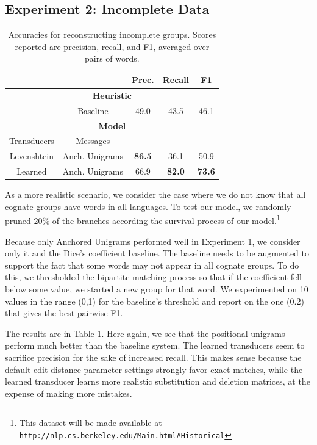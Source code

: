 \documentclass[11pt,a4paper]{article}
\begin{document}
\subsection{Experiment 2: Incomplete Data}

\begin{table}
\resizebox{3in}{!} {
  \begin{tabular}{|c|c|c|c|c|}
    \cline{3-5} 
    \multicolumn{2}{c|}{\textbf{}} & Prec. & Recall & F1 \\
    \hline 
    \multicolumn{5}{|c|}{\textbf{Heuristic}} \\
    \hline
    \multicolumn{1}{|c}{} & \multicolumn{1}{c|}{Baseline} & 49.0 &
    43.5 & 46.1 \\
    \hline
    \hline
    \multicolumn{5}{|c|}{\textbf{Model}} \\
    \hline
    Transducers & Messages & \multicolumn{2}{c}{} \\
    \hline
    Levenshtein&Anch. Unigrams & \textbf{86.5} & 36.1 & 50.9 \\
    Learned&Anch. Unigrams  & 66.9 & \textbf{82.0} & \textbf{73.6} \\
    \hline
  \end{tabular}
 }
  \caption{Accuracies for reconstructing incomplete groups. Scores
  reported are precision, recall, and F1, averaged over pairs of words.}
  \label{tbl:partial}
\end{table}

As a more realistic scenario, we consider the case where we do not
know that all cognate groups have words in all languages. To test
our model, we randomly pruned 20\% of the branches according the
survival process of our model.\footnote{This dataset will be made available at
{\scriptsize{\texttt{http://nlp.cs.berkeley.edu/Main.html\#Historical}}}}

Because only Anchored Unigrams performed well in Experiment 1, we
consider only it and the Dice's coefficient baseline. The baseline
needs to be augmented to support the fact that some words may not
appear in all cognate groups. To do this, we thresholded the bipartite
matching process so that if the coefficient fell below some value,
we started a new group for that word. We experimented on 10 values
in the range (0,1) for the baseline's threshold and report on the
one (0.2) that gives the best pairwise F1.

The results are in Table \ref{tbl:partial}. Here again, we see that
the positional unigrams perform much better than the baseline system.
The learned transducers seem to sacrifice precision for the sake
of increased recall. This makes sense because the default edit
distance parameter settings strongly favor exact matches, while the
learned transducer learns more realistic substitution and deletion
matrices, at the expense of making more mistakes.
\end{document}

